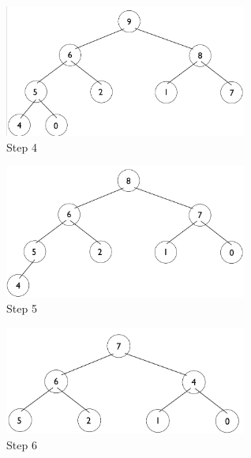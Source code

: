 \documentclass[11pt,letterpaper]{article}
\begin{document}
\begin{figure}[!ht]

	\begin{center}
	\includegraphics[width=80mm]{images/6_5_1_4_tree.png}
	\end{center}

\caption{Step 4 }
\end{figure}

\pagebreak

\begin{figure}[!ht]

	\begin{center}
	\includegraphics[width=80mm]{images/6_5_1_5_tree.png}
	\end{center}

\caption{Step 5 }
\end{figure}

\begin{figure}[!ht]

	\begin{center}
	\includegraphics[width=80mm]{images/6_5_1_6_tree.png}
	\end{center}

\caption{Step 6 }
\end{figure}

\pagebreak
\end{document}
